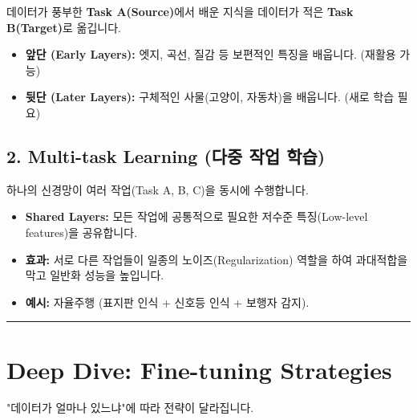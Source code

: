 \documentclass[11pt,a4paper]{book}
\theoremstyle{definition}
\begin{document}
데이터가 풍부한 \textbf{Task A(Source)}에서 배운 지식을 데이터가 적은 \textbf{Task B(Target)}로 옮깁니다.
\begin{itemize}
    \item \textbf{앞단 (Early Layers):} 엣지, 곡선, 질감 등 보편적인 특징을 배웁니다. (재활용 가능)
    \item \textbf{뒷단 (Later Layers):} 구체적인 사물(고양이, 자동차)을 배웁니다. (새로 학습 필요)
\end{itemize}

\subsection{2. Multi-task Learning (다중 작업 학습)}


하나의 신경망이 여러 작업(Task A, B, C)을 동시에 수행합니다.
\begin{itemize}
    \item \textbf{Shared Layers:} 모든 작업에 공통적으로 필요한 저수준 특징(Low-level features)을 공유합니다.
    \item \textbf{효과:} 서로 다른 작업들이 일종의 노이즈(Regularization) 역할을 하여 과대적합을 막고 일반화 성능을 높입니다.
    \item \textbf{예시:} 자율주행 (표지판 인식 + 신호등 인식 + 보행자 감지).
\end{itemize}

\vspace{0.5cm}\hrule\vspace{0.5cm}

\section{Deep Dive: Fine-tuning Strategies}

"데이터가 얼마나 있느냐"에 따라 전략이 달라집니다.
\end{document}
